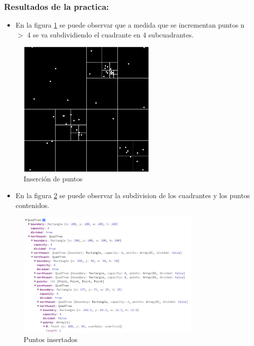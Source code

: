 \documentclass{article}
\begin{document}
\subsubsection{Resultados de la practica: }

\begin{itemize}
\item En la figura \ref{fig:quadtree_insert} se puede observar que a medida que se incrementan puntos n $>$ 4 se va subdividiendo el cuadrante en 4 subcuadrantes.
\end{itemize}

\begin{figure}[htbp]
\centering
\includegraphics[width=0.6\textwidth]{img/quadtree_insert.png}
\caption{Inserción de puntos}
\label{fig:quadtree_insert}
\end{figure}

\begin{itemize}
\item En la figura \ref{fig:quadtree_insert_data} se puede observar la subdivision de los cuadrantes y los puntos contenidos.
\end{itemize}

\begin{figure}[htbp]
\centering
\includegraphics[width=0.8\textwidth]{img/quadtree_insert_data.png}
\caption{Puntos insertados}
\label{fig:quadtree_insert_data}
\end{figure}
\end{document}
